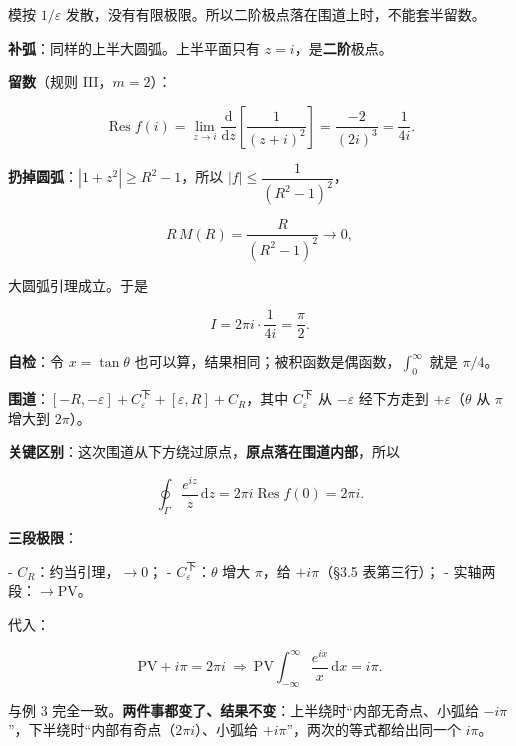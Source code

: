 \documentclass[11pt]{ctexart}
\renewcommand{\qbreak}{\needspace{0.45\textheight}}
\begin{document}
模按 $1/\varepsilon$ 发散，没有有限极限。所以二阶极点落在围道上时，不能套半留数。

\qbreak
{}

\textbf{补弧}：同样的上半大圆弧。上半平面只有 $z=i$，是\textbf{二阶}极点。

\textbf{留数}（规则 III，$m=2$）：

$$
\operatorname{Res}f(i)=\lim_{z\to i}\frac{\mathrm{d}}{\mathrm{d}z}\left[\frac{1}{(z+i)^{2}}\right]
=\frac{-2}{(2i)^{3}}=\frac{1}{4i}.
$$

\textbf{扔掉圆弧}：$|1+z^{2}|\ge R^{2}-1$，所以 $|f|\le\dfrac{1}{(R^{2}-1)^{2}}$，

$$
R\,M(R)=\frac{R}{(R^{2}-1)^{2}}\to0 ,
$$

大圆弧引理成立。于是

$$
I=2\pi i\cdot\frac{1}{4i}=\frac{\pi}{2}.
$$

\textbf{自检}：令 $x=\tan\theta$ 也可以算，结果相同；被积函数是偶函数，$\int_0^\infty$ 就是 $\pi/4$。

\qbreak
{}

\textbf{围道}：$[-R,-\varepsilon]+C_\varepsilon^{\text{下}}+[\varepsilon,R]+C_R$，其中 $C_\varepsilon^{\text{下}}$ 从 $-\varepsilon$ 经下方走到 $+\varepsilon$（$\theta$ 从 $\pi$ 增大到 $2\pi$）。

\textbf{关键区别}：这次围道从下方绕过原点，\textbf{原点落在围道内部}，所以

$$
\oint_\Gamma\frac{e^{iz}}{z}\,\mathrm{d}z=2\pi i\operatorname{Res}f(0)=2\pi i .
$$

\textbf{三段极限}：

- $C_R$：约当引理，$\to0$；
- $C_\varepsilon^{\text{下}}$：$\theta$ 增大 $\pi$，给 $+i\pi$（§3.5 表第三行）；
- 实轴两段：$\to\mathrm{PV}$。

代入：

$$
\mathrm{PV}+i\pi=2\pi i
\ \Longrightarrow\
\mathrm{PV}\!\int_{-\infty}^{\infty}\frac{e^{ix}}{x}\,\mathrm{d}x=i\pi .
$$

与例 3 完全一致。\textbf{两件事都变了、结果不变}：上半绕时“内部无奇点、小弧给 $-i\pi$”，下半绕时“内部有奇点（$2\pi i$）、小弧给 $+i\pi$”，两次的等式都给出同一个 $i\pi$。

\end{document}
